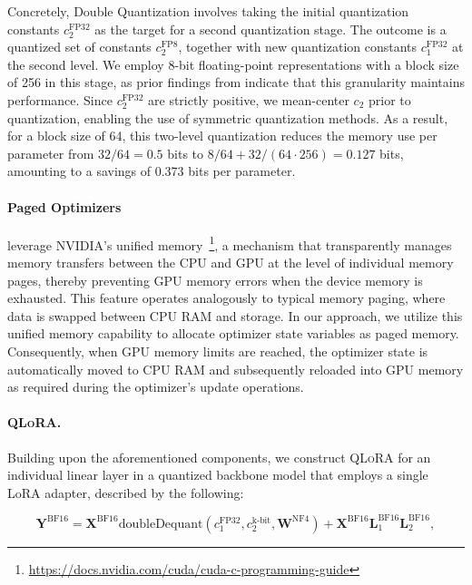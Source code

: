 Concretely, Double Quantization involves taking the initial quantization constants $c_2^{\text{FP32}}$ as the target for a second quantization stage. The outcome is a quantized set of constants $c_2^{\text{FP8}}$, together with new quantization constants $c_1^{\text{FP32}}$ at the second level. We employ 8-bit floating-point representations with a block size of 256 in this stage, as prior findings from \citet{dettmers2022case} indicate that this granularity maintains performance. Since $c_2^{\text{FP32}}$ are strictly positive, we mean-center $c_2$ prior to quantization, enabling the use of symmetric quantization methods. As a result, for a block size of 64, this two-level quantization reduces the memory use per parameter from $32/64 = 0.5$ bits to $8/64 + 32/(64\cdot256) = 0.127$ bits, amounting to a savings of 0.373 bits per parameter.

\paragraph{Paged Optimizers} leverage NVIDIA's unified memory~\footnote{\tiny \url{https://docs.nvidia.com/cuda/cuda-c-programming-guide}}, a mechanism that transparently manages memory transfers between the CPU and GPU at the level of individual memory pages, thereby preventing GPU memory errors when the device memory is exhausted. This feature operates analogously to typical memory paging, where data is swapped between CPU RAM and storage. In our approach, we utilize this unified memory capability to allocate optimizer state variables as paged memory. Consequently, when GPU memory limits are reached, the optimizer state is automatically moved to CPU RAM and subsequently reloaded into GPU memory as required during the optimizer's update operations.

\paragraph{\textsc{QLoRA}.} Building upon the aforementioned components, we construct \textsc{QLoRA} for an individual linear layer in a quantized backbone model that employs a single LoRA adapter, described by the following:

\begin{equation}
    \mathbf{Y}^{\text{BF16}} =  \mathbf{X}^{\text{BF16}} \text{doubleDequant}(c_1^{\text{FP32}}, c_2^{\text{k-bit}}, \mathbf{W}^{\text{NF4}}) + \mathbf{X}^{\text{BF16}}\mathbf{L}^{\text{BF16}}_1\mathbf{L}^{\text{BF16}}_2,
\end{equation}

